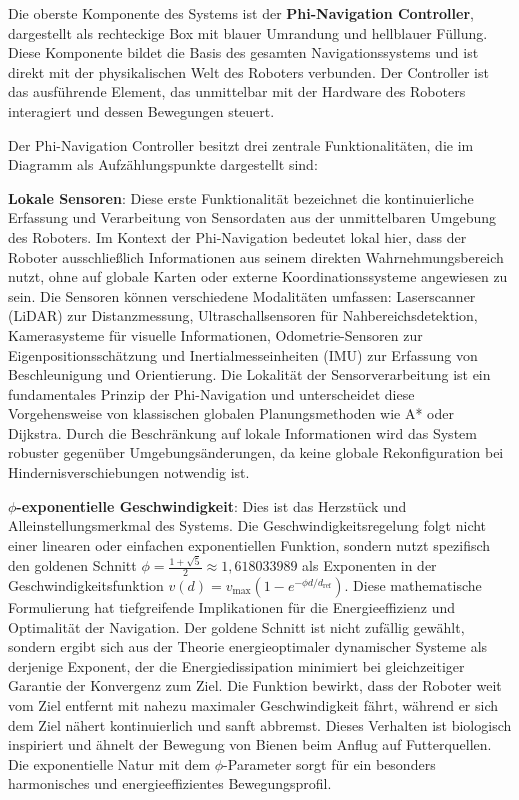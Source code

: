﻿\documentclass[a4paper,12pt]{article}
\theoremstyle{definition}
\begin{document}
Die oberste Komponente des Systems ist der \textbf{Phi-Navigation Controller}, dargestellt als rechteckige Box mit blauer Umrandung und hellblauer Füllung. Diese Komponente bildet die Basis des gesamten Navigationssystems und ist direkt mit der physikalischen Welt des Roboters verbunden. Der Controller ist das ausführende Element, das unmittelbar mit der Hardware des Roboters interagiert und dessen Bewegungen steuert.

Der Phi-Navigation Controller besitzt drei zentrale Funktionalitäten, die im Diagramm als Aufzählungspunkte dargestellt sind:

\textbf{Lokale Sensoren}: Diese erste Funktionalität bezeichnet die kontinuierliche Erfassung und Verarbeitung von Sensordaten aus der unmittelbaren Umgebung des Roboters. Im Kontext der Phi-Navigation bedeutet lokal hier, dass der Roboter ausschließlich Informationen aus seinem direkten Wahrnehmungsbereich nutzt, ohne auf globale Karten oder externe Koordinationssysteme angewiesen zu sein. Die Sensoren können verschiedene Modalitäten umfassen: Laserscanner (LiDAR) zur Distanzmessung, Ultraschallsensoren für Nahbereichsdetektion, Kamerasysteme für visuelle Informationen, Odometrie-Sensoren zur Eigenpositionsschätzung und Inertialmesseinheiten (IMU) zur Erfassung von Beschleunigung und Orientierung. Die Lokalität der Sensorverarbeitung ist ein fundamentales Prinzip der Phi-Navigation und unterscheidet diese Vorgehensweise von klassischen globalen Planungsmethoden wie A* oder Dijkstra. Durch die Beschränkung auf lokale Informationen wird das System robuster gegenüber Umgebungsänderungen, da keine globale Rekonfiguration bei Hindernisverschiebungen notwendig ist.

\textbf{$\phi$-exponentielle Geschwindigkeit}: Dies ist das Herzstück und Alleinstellungsmerkmal des Systems. Die Geschwindigkeitsregelung folgt nicht einer linearen oder einfachen exponentiellen Funktion, sondern nutzt spezifisch den goldenen Schnitt $\phi = \frac{1+\sqrt{5}}{2} \approx 1{,}618033989$ als Exponenten in der Geschwindigkeitsfunktion $v(d) = v_{\max}(1 - e^{-\phi d/d_{\text{ref}}})$. Diese mathematische Formulierung hat tiefgreifende Implikationen für die Energieeffizienz und Optimalität der Navigation. Der goldene Schnitt ist nicht zufällig gewählt, sondern ergibt sich aus der Theorie energieoptimaler dynamischer Systeme als derjenige Exponent, der die Energiedissipation minimiert bei gleichzeitiger Garantie der Konvergenz zum Ziel. Die Funktion bewirkt, dass der Roboter weit vom Ziel entfernt mit nahezu maximaler Geschwindigkeit fährt, während er sich dem Ziel nähert kontinuierlich und sanft abbremst. Dieses Verhalten ist biologisch inspiriert und ähnelt der Bewegung von Bienen beim Anflug auf Futterquellen. Die exponentielle Natur mit dem $\phi$-Parameter sorgt für ein besonders harmonisches und energieeffizientes Bewegungsprofil.
\end{document}
